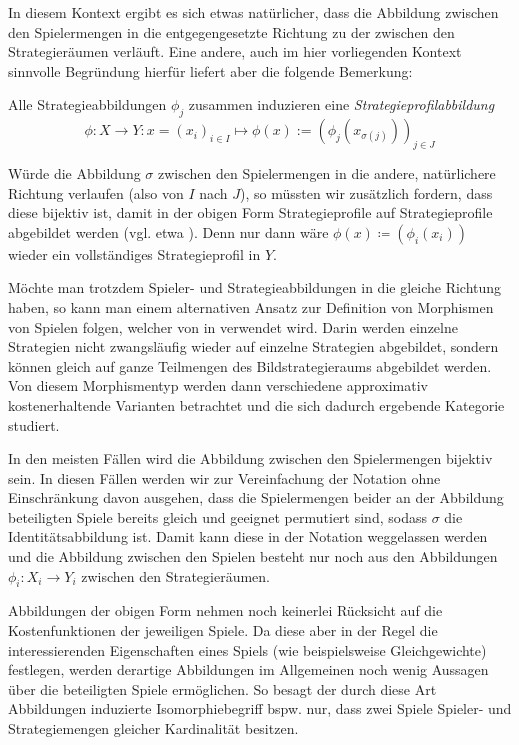 In diesem Kontext ergibt es sich etwas natürlicher, dass die Abbildung zwischen den Spielermengen in die entgegengesetzte Richtung zu der zwischen den Strategieräumen verläuft. Eine andere, auch im hier vorliegenden Kontext sinnvolle Begründung hierfür liefert aber die folgende Bemerkung:

\begin{bem}
	Alle Strategieabbildungen $\phi_j$ zusammen induzieren eine \emph{Strategieprofilabbildung}
	\[\phi: X \to Y: x=(x_i)_{i\in I} \mapsto \phi(x) := \left(\phi_j(x_{\sigma(j)})\right)_{j \in J} \]
\end{bem}

Würde die Abbildung $\sigma$ zwischen den Spielermengen in die andere, \glqq natürlichere\grqq{} Richtung verlaufen (also von $I$ nach $J$), so müssten wir zusätzlich fordern, dass diese bijektiv ist, damit in der obigen Form Strategieprofile auf Strategieprofile abgebildet werden (vgl. etwa \cite{CatGameTheory}). Denn nur dann wäre $\phi(x) \coloneqq \left(\phi_i(x_i)\right)$ wieder ein vollständiges Strategieprofil in $Y$.

\begin{bem}
	Möchte man trotzdem Spieler- und Strategieabbildungen in die gleiche Richtung haben, so kann man einem alternativen Ansatz zur Definition von Morphismen von Spielen folgen, welcher von \citeauthor{Foundations} in \cite{Foundations} verwendet wird. Darin werden einzelne Strategien nicht zwangsläufig wieder auf einzelne Strategien abgebildet, sondern können gleich auf ganze Teilmengen des Bildstrategieraums abgebildet werden. Von diesem Morphismentyp werden dann verschiedene \glqq approximativ kostenerhaltende\grqq{} Varianten betrachtet und die sich dadurch ergebende Kategorie studiert.
\end{bem}

\begin{notation}
	In den meisten Fällen wird die Abbildung zwischen den Spielermengen bijektiv sein. In diesen Fällen werden wir zur Vereinfachung der Notation ohne Einschränkung davon ausgehen, dass die Spielermengen beider an der Abbildung beteiligten Spiele bereits gleich und geeignet permutiert sind, sodass $\sigma$ die Identitätsabbildung ist. Damit kann diese in der Notation weggelassen werden und die Abbildung zwischen den Spielen besteht nur noch aus den Abbildungen $\phi_i: X_i \to Y_i$ zwischen den Strategieräumen.
\end{notation}

Abbildungen der obigen Form nehmen noch keinerlei Rücksicht auf die Kostenfunktionen der jeweiligen Spiele. Da diese aber in der Regel die interessierenden Eigenschaften eines Spiels (wie beispielsweise Gleichgewichte) festlegen, werden derartige Abbildungen im Allgemeinen noch wenig Aussagen über die beteiligten Spiele ermöglichen. So besagt der durch diese Art Abbildungen induzierte Isomorphiebegriff bspw. nur, dass zwei Spiele Spieler- und Strategiemengen gleicher Kardinalität besitzen.

